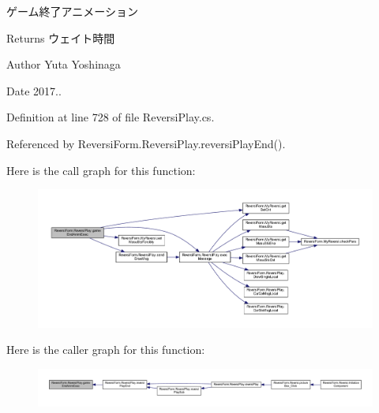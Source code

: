 ゲーム終了アニメーション 

\begin{DoxyReturn}{Returns}
ウェイト時間 
\end{DoxyReturn}
\begin{DoxyAuthor}{Author}
Yuta Yoshinaga 
\end{DoxyAuthor}
\begin{DoxyDate}{Date}
2017.. 
\end{DoxyDate}


Definition at line 728 of file Reversi\+Play.\+cs.



Referenced by Reversi\+Form.\+Reversi\+Play.\+reversi\+Play\+End().

Here is the call graph for this function\+:\nopagebreak
\begin{figure}[H]
\begin{center}
\leavevmode
\includegraphics[width=350pt]{class_reversi_form_1_1_reversi_play_aec95b109a53b3cdab6466a4fca52f967_cgraph}
\end{center}
\end{figure}
Here is the caller graph for this function\+:\nopagebreak
\begin{figure}[H]
\begin{center}
\leavevmode
\includegraphics[width=350pt]{class_reversi_form_1_1_reversi_play_aec95b109a53b3cdab6466a4fca52f967_icgraph}
\end{center}
\end{figure}
\mbox{\label{class_reversi_form_1_1_reversi_play_a03997d634aa21a84e660e7f98aa27064}} 
